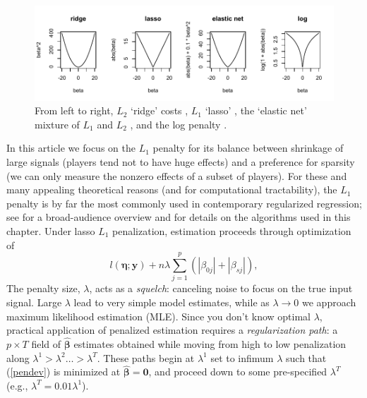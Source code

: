 \begin{figure}[t]
\includegraphics[width=\textwidth]{figures/penalties}
\caption{\label{costs} 
From left to right, 
$L_2$ `ridge' costs \cite{hoerl_ridge_1970}, $L_1$ `lasso' \cite{tibshirani_regression_1996}, the `elastic net' mixture of $L_1$ and $L_2$ \cite{zou_regularization_2005}, and the log penalty \cite{candes_enhancing_2008}.
}
\end{figure}

In this article we focus on the $L_1$ penalty for its balance between
shrinkage of large signals (players tend not to have huge effects) and a
preference for sparsity (we can only measure the nonzero effects of a subset
of players).  For these and many appealing theoretical reasons (and for
computational tractability), the $L_1$ penalty is by far the most commonly
used in contemporary regularized regression; see
\cite{hastie:tibsh:fried:2001} for a broad-audience overview and
\cite{taddy_one-step_2015} for details on the algorithms used in this chapter.
Under lasso $L_1$ penalization, estimation proceeds through optimization of
\begin{equation} \label{pendev}
l\left(\boldsymbol{\eta}; \mathbf{y}\right) + n\lambda \sum_{j=1}^p\left(|\beta_{0j}| + |\beta_{sj}|\right),
\end{equation}
The penalty size, $\lambda$, acts as a {\it squelch}: canceling noise to
focus on the true input signal. Large $\lambda$ lead to very simple  model
estimates, while as $\lambda \rightarrow 0$ we approach maximum likelihood
estimation (MLE). Since you don't know optimal $\lambda$, practical
application of penalized estimation requires a {\it regularization path}: a $p
\times T$ field of $\boldsymbol{\hat\beta}$ estimates obtained while moving
from high to low penalization along $\lambda^1 > \lambda^2 \ldots >
\lambda^T$. These paths begin at $\lambda^1$ set to infimum $\lambda$ such
that (\ref{pendev}) is minimized at $\boldsymbol{\hat\beta} = \mathbf{0}$, and proceed
down to some pre-specified $\lambda^T$ (e.g., $\lambda^T= 0.01\lambda^1$).

